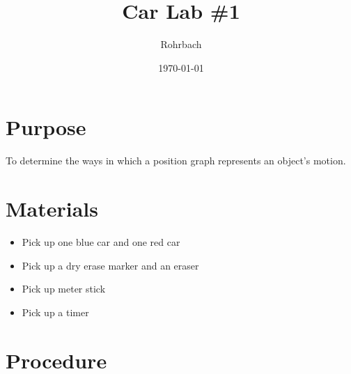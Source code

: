 \documentclass[10pt]{exam}
\title{Car Lab \#1}
\author{Rohrbach}
\date{\today}
\begin{document}
\maketitle

\section*{Purpose}

To determine the ways in which a position graph represents an object's motion.

\section*{Materials}

\begin{itemize}
  \item Pick up one blue car and one red car
  \item Pick up a dry erase marker and an eraser
  \item Pick up meter stick 
  \item	Pick up a timer
\end{itemize}

\section*{Procedure}

\end{document}
